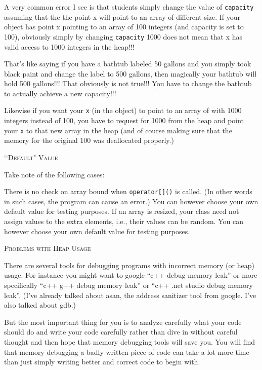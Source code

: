 A very common error I see is that students simply change the value of 
\verb!capacity! assuming that the the point x will point to an array of 
different size. If your object has point x pointing to an array of 100 
integers (and capacity is set to 100), obviously simply by changing 
\verb!capacity! 1000 does not mean that x has valid access to 1000 
integers in the heap!!!

That's like saying if you have a bathtub labeled 50 gallons and you 
simply took black paint and change the label to 500 gallons,
then magically
your 
bathtub will hold 500 gallons!!! That obviously is not true!!! You have 
to change the bathtub to actually achieve a new capacity!!!

Likewise if you want your \verb!x! (in the object) to point to an array of 
with 1000 integers instead of 100, you have to request for 1000 from 
the heap and point your \verb!x! to that new array in the heap (and of course 
making sure that the memory for the original 100 was deallocated properly.)


\newpage
\textsc{\lq\lq Default" Value}

Take note of the following cases:
\begin{tightlist}
\li There is no check on array bound when \verb!operator[]()! is called. 
(In other words in such cases, the program can cause an error.) You can 
however choose your own default value for testing purposes.
\li If an array is resized, your class need not assign values to the extra 
elements, i.e., their values can be random. You can however choose your own 
default value for testing purposes.
\end{tightlist}


\newpage
\textsc{Problems with Heap Usage}

There are several tools for debugging programs with incorrect memory (or heap) 
usage.
For instance you might want to google “c++ debug memory leak” or more 
specifically “c++ g++ debug memory leak” or “c++ .net studio debug memory leak”.
(I've already talked about asan, the address sanitizer tool from google.
I've also talked about gdb.)

But the most important thing for you is to analyze carefully what your code 
should do and write your code carefully rather than dive in without careful 
thought and then hope that memory debugging tools will save you. You will find 
that memory debugging a badly written piece of code can take a lot more time than 
just simply writing better and correct code to begin with.

